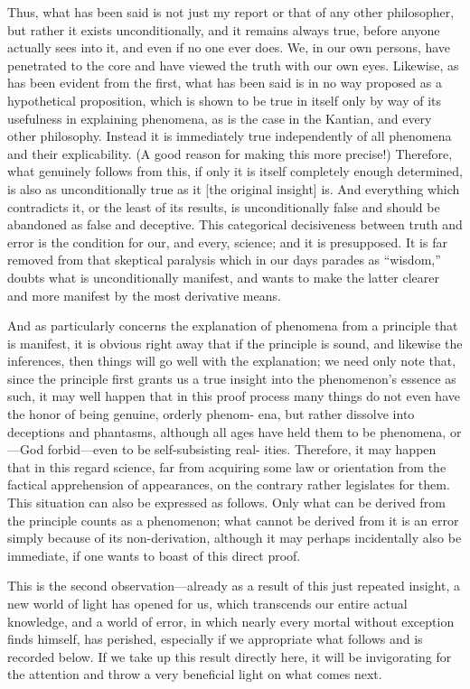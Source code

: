 Thus, what has been said is not just my report
or that of any other philosopher,
but rather it exists unconditionally,
and it remains always true,
before anyone actually sees into it,
and even if no one ever does.
We, in our own persons, have penetrated to the core
and have viewed the truth with our own eyes.
Likewise, as has been evident from the first,
what has been said is in no way proposed as
a hypothetical proposition, which is shown to be true in itself
only by way of its usefulness in explaining phenomena,
as is the case in the Kantian, and every other philosophy.
Instead it is immediately true independently of
all phenomena and their explicability.
(A good reason for making this more precise!)
Therefore, what genuinely follows from this,
if only it is itself completely enough determined,
is also as unconditionally true as it [the original insight] is.
And everything which contradicts it,
or the least of its results, is unconditionally false
and should be abandoned as false and deceptive.
This categorical decisiveness between truth and error
is the condition for our, and every, science;
and it is presupposed.
It is far removed from that skeptical paralysis which in our days parades as
“wisdom,” doubts what is unconditionally manifest, and wants to make the
latter clearer and more manifest by the most derivative means.

And as particularly concerns the explanation of phenomena from a
principle that is manifest, it is obvious right away that if the principle is sound,
and likewise the inferences, then things will go well with the explanation; we
need only note that, since the principle first grants us a true insight into the
phenomenon’s essence as such, it may well happen that in this proof process
many things do not even have the honor of being genuine, orderly phenom-
ena, but rather dissolve into deceptions and phantasms, although all ages have
held them to be phenomena, or—God forbid—even to be self-subsisting real-
ities.
Therefore, it may happen that in this regard science,
far from acquiring some law or orientation from
the factical apprehension of appearances,
on the contrary rather legislates for them.
This situation can also be expressed as follows.
Only what can be derived from the principle counts as a phenomenon;
what cannot be derived from it is an error
simply because of its non-derivation,
although it may perhaps incidentally also be immediate,
if one wants to boast of this direct proof.

This is the second observation—already as a result of this just repeated
insight, a new world of light has opened for us, which transcends our entire
actual knowledge, and a world of error, in which nearly every mortal without
exception finds himself, has perished, especially if we appropriate what follows
and is recorded below.
If we take up this result directly here,
it will be invigorating for the attention
and throw a very beneficial light on what comes next.

